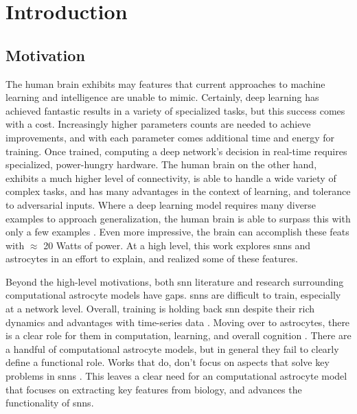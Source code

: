 %
%
%
%
%


\chapter{Introduction}\label{section:introduction}
\section{Motivation}

The human brain exhibits may features that current approaches to machine
learning and intelligence are unable to mimic. Certainly, deep learning has
achieved fantastic results in a variety of specialized tasks, but this success
comes with a cost. Increasingly higher parameters counts are needed to
achieve improvements, and with each parameter comes additional time and energy
for training. Once trained, computing a deep network's decision in real-time
requires specialized, power-hungry hardware. The human brain on the other hand,
exhibits a much higher level of connectivity, is able to handle a wide variety
of complex tasks, and has many advantages in the context of learning, and
tolerance to adversarial inputs. Where a deep learning model requires many
diverse examples to approach generalization, the human brain is able to
surpass this with only a few examples \parencite{tsimenidis_2020}. Even more
impressive, the brain can accomplish these feats with $\approx$ 20 Watts of
power. At a high level, this work explores \glspl{snn} and astrocytes in an
effort to explain, and realized some of these features.

Beyond the high-level motivations, both \gls{snn} literature and research
surrounding computational astrocyte models have gaps. \glspl{snn} are difficult
to train, especially at a network level. Overall, training is holding back
\gls{snn} despite their rich dynamics and advantages with time-series data
\parencite{tavanaei_2019}. Moving over to astrocytes, there is a clear role for
them in computation, learning, and overall cognition
\parencite{mederos_2018}. There are a handful of computational astrocyte models,
but in general they fail to clearly define a functional role. Works that do,
don't focus on aspects that solve key problems in \glspl{snn}
\parencite{manninen_2019}. This leaves a clear need for an computational
astrocyte model that focuses on extracting key features from biology, and
advances the functionality of \glspl{snn}.

